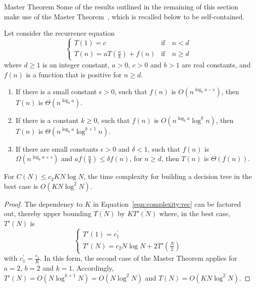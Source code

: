 \begin{remark}{Master Theorem}
Some of the results outlined in the remaining of this section make use of the
Master Theorem~\citep{bentley:1980,goodrich:2006}, which is recalled below to be self-contained.

\begin{theorem}
Let consider the recurrence equation
\begin{equation}
\begin{cases}
T(1) = c & \text{if}\quad n < d\\
T(n) = aT(\frac{n}{b}) + f(n) & \text{if}\quad n \geq d
\end{cases}
\end{equation}
where $d \geq 1$ is an integer constant, $a > 0$, $c>0$ and $b>1$ are real constants, and
$f(n)$ is a function that is positive for $n \geq d$.

\begin{enumerate}
\item If there is a small constant $\epsilon > 0$, such that $f(n)$ is $O(n^{\log_b a - \epsilon})$, then $T(n)$ is $\Theta(n^{\log_b a})$.
\item If there is a constant $k \geq 0$, such that $f(n)$ is $O(n^{\log_b a} \log^k n)$, then $T(n)$ is $\Theta(n^{\log_b a} \log^{k+1} n)$.
\item If there are small constants $\epsilon > 0$ and $\delta < 1$, such that $f(n)$ is $\Omega(n^{\log_b a + \epsilon})$ and $af(\tfrac{n}{b}) \leq \delta f(n)$, for $n \geq d$, then $T(n)$ is $\Theta(f(n))$.
\end{enumerate}
\end{theorem}
\end{remark}

\begin{theorem}\label{thm:6:best:knlogn}
For $C(N) \leq c_2 KN\log N$, the time complexity for building a decision
tree in the best case is $O(K N \log^2 N)$.
\end{theorem}

\begin{proof}
The dependency to $K$ in
Equation~\ref{eqn:complexity:rec} can be factored out, thereby upper bounding
$T(N)$ by $K T'(N)$ where, in the best case, $T'(N)$ is
\begin{equation}
\begin{cases}
T'(1) = c_1^\prime \\
T'(N) = c_2 N \log N + 2 T'(\frac{N}{2})
\end{cases}
\end{equation}
with $c_1^\prime = \tfrac{c_1}{K}$. In this form, the second case of the Master Theorem applies for
$a=2$, $b=2$ and $k=1$. Accordingly, $T'(N)=O(N\log^{k+1} N)=O(N\log^2 N)$ and $T(N) = O(K N\log^2 N)$.
\end{proof}

